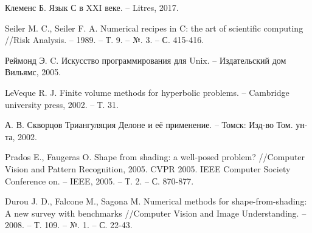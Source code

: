 \begin{thebibliography}{99}
 Клеменс Б. Язык С в XXI веке. – Litres, 2017.

Seiler M. C., Seiler F. A. Numerical recipes in C: the
  art of scientific computing //Risk Analysis. – 1989. – Т. 9. –
  №. 3. – С. 415-416.
  
 Реймонд Э. C. Искусство программирования для Unix. –
  Издательский дом Вильямс, 2005.

 LeVeque R. J. Finite volume methods for hyperbolic
  problems. – Cambridge university press, 2002. – Т. 31.

 {А. В. Скворцов} Триангуляция Делоне и её применение. –
  Томск: Изд-во Том. ун-та, 2002.

 Prados E., Faugeras O. Shape from shading: a
  well-posed problem? //Computer Vision and Pattern Recognition,
  2005. CVPR 2005. IEEE Computer Society Conference on. – IEEE,
  2005. – Т. 2. – С. 870-877.
  
Durou J. D., Falcone M., Sagona M. Numerical methods
  for shape-from-shading: A new survey with benchmarks //Computer
  Vision and Image Understanding. – 2008. – Т. 109. – №. 1. –
  С. 22-43.
\end{thebibliography}


